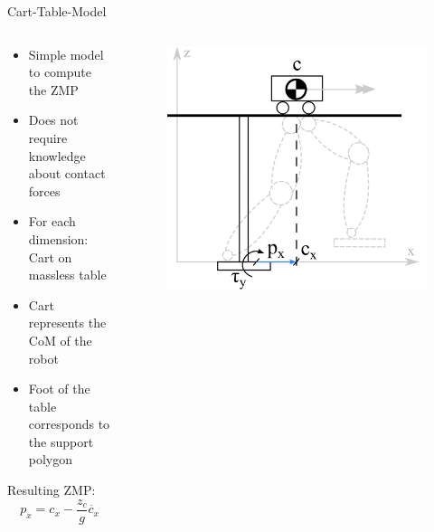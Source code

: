 \begin{frame}{Cart-Table-Model}

\begin{columns}
\begin{column}{0.5\textwidth}
\begin{itemize}
\item Simple model to compute the ZMP
\item Does not require knowledge about contact forces
\item For each dimension: Cart on massless table
\item Cart represents the CoM of the robot
\item Foot of the table corresponds to the support polygon
\end{itemize}

Resulting ZMP:
\begin{equation*} \label{eq:zmp-x}
p_x = c_x - \frac{z_c}{g} \ddot{c_x}
\end{equation*}
\end{column}

\begin{column}{0.5\textwidth}
\begin{figure}
  \begin{center}
     \includegraphics[width=\textwidth]{images/carttable.png}
  \end{center}
\end{figure}
\end{column}
\end{columns}

\end{frame}

